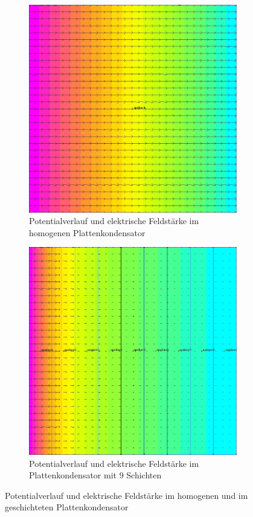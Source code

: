\begin{figure}[h]
\begin{subfigure}[c]{0.35\textwidth}
		\includegraphics[width=\textwidth]{data/KondensatorN1_EFeld}
		\caption{Potentialverlauf und elektrische Feldstärke im homogenen Plattenkondensator}
		\label{fig:N1_EFeld}
	\end{subfigure}
	\begin{subfigure}[c]{0.35\textwidth}
		\includegraphics[width=\textwidth]{data/KondensatorN9_EFeld}
		\caption{Potentialverlauf und elektrische Feldstärke im Plattenkondensator mit 9 Schichten}
		\label{fig:N9_EFeld}
\end{subfigure}
	\caption{Potentialverlauf und elektrische Feldstärke im homogenen und im geschichteten Plattenkondensator}
\end{figure}

